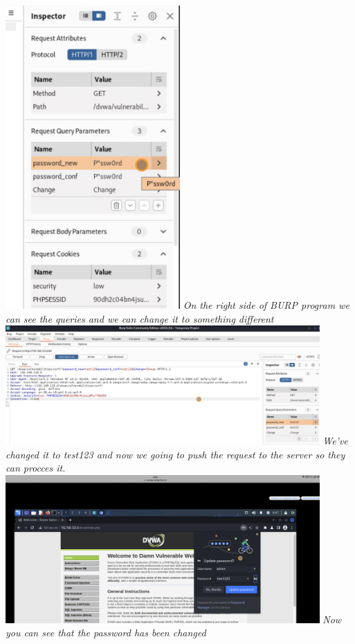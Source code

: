 \documentclass[12pt, letterpaper]{article}
\begin{document}
\hfill\break
\hfill\break
\includegraphics[width=0.5\textwidth]{fotos/Week 4/CSRF/CSRF password query .jpeg}
\break
\emph{On the right side of BURP program we can see the queries and we can change it to something different}
\hfill\break
\hfill\break
\includegraphics[width=0.9\textwidth]{fotos/Week 4/CSRF/Push new password.jpeg}
\break
\emph{We've changed it to test123 and now we going to push the request to the server so they can procces it.}
\hfill\break
\hfill\break
\includegraphics[width=0.9\textwidth]{fotos/Week 4/CSRF/Password changed.jpeg}
\break
\emph{Now you can see that the password has been changed}
\newpage
\end{document}
